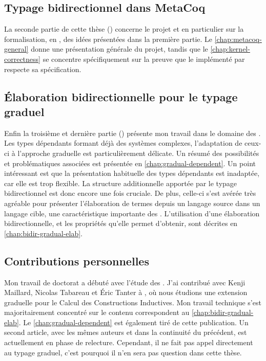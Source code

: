 \subsection{Typage bidirectionnel dans MetaCoq}

La seconde partie de cette thèse ()
concerne le projet 
et en particulier sur la formalisation, en , des idées présentées dans la
première partie. Le \cref{chap:metacoq-general} donne une présentation générale du
projet, tandis que le \cref{chap:kernel-correctness} se concentre spécifiquement
sur la preuve que le  implémenté par  respecte sa spécification.

\subsection{Élaboration bidirectionnelle pour le typage graduel}

Enfin la troisième et dernière partie ()
présente mon travail
dans le domaine des . Les types dépendants formant déjà des systèmes
complexes, l’adaptation de ceux-ci à l’approche graduelle est particulièrement
délicate. Un résumé des possibilités et problématiques associées est présentée
en \cref{chap:gradual-dependent}.
Un point intéressant est que la présentation habituelle
des types dépendants est inadaptée,
car elle est trop flexible. La structure additionnelle apportée
par le typage bidirectionnel est donc encore une fois cruciale.
De plus, celle-ci s’est avérée très agréable pour présenter
l’élaboration de termes depuis un langage source dans un langage cible, une
caractéristique importante des .
L’utilisation d’une élaboration bidirectionnelle, et les propriétés qu’elle
permet d’obtenir, sont décrites en \cref{chap:bidir-gradual-elab}.

\subsection{Contributions personnelles}

Mon travail de doctorat a débuté avec l’étude des  .
J’ai contribué avec Kenji Maillard, Nicolas Tabareau et Éric Tanter à
, où nous étudions une extension graduelle
pour le Calcul des Constructions Inductives. Mon travail technique s’est
majoritairement concentré sur le contenu correspondent au \cref{chap:bidir-gradual-elab}.
Le \cref{chap:gradual-dependent} est également tiré de cette publication.
Un second article, avec les mêmes auteurs et dans la continuité du précédent,
est actuellement en phase de relecture. Cependant, il
ne fait pas appel directement au typage graduel, c’est pourquoi il n’en
sera pas question dans cette thèse.

